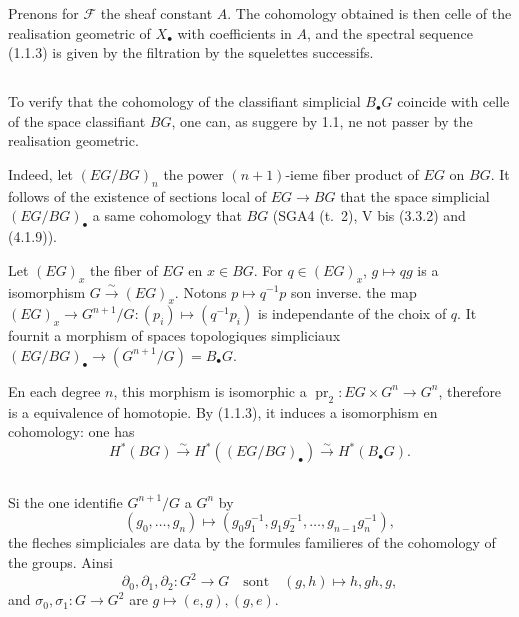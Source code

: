 \documentclass[11pt,a4paper]{article}
\theoremstyle{plain}
\theoremstyle{definition}
\DeclareMathOperator{\pr}{pr}
\begin{document}
Prenons for $\mathscr{F}$ the sheaf constant $A$. The cohomology obtained is then celle of the realisation geometric of $X_\bullet$ with coefficients in $A$, and the spectral sequence (1.1.3) is given by the filtration by the squelettes successifs.

\subsection{}\label{1.2}

To verify that the cohomology of the classifiant simplicial $B_\bullet G$ coincide with celle of the space classifiant $BG$, one can, as suggere by 1.1, ne not passer by the realisation geometric.

Indeed, let $(EG/BG)_n$ the power $(n+1)$-ieme fiber product of $EG$ on $BG$. It follows of the existence of sections local of $EG \to BG$ that the space simplicial $(EG/BG)_\bullet$ a same cohomology that $BG$ (SGA4 (t.~2), V bis (3.3.2) and (4.1.9)).

Let $(EG)_x$ the fiber of $EG$ en $x \in BG$. For $q \in (EG)_x$, $g \mapsto qg$ is a isomorphism $G \xrightarrow{\sim} (EG)_x$. Notons $p \mapsto q^{-1}p$ son inverse. the map $(EG)_x \to G^{n+1}/G : (p_i) \mapsto (q^{-1}p_i)$ is independante of the choix of $q$. It fournit a morphism of spaces topologiques simpliciaux $(EG/BG)_\bullet \to (G^{n+1}/G) = B_\bullet G$.

En each degree $n$, this morphism is isomorphic a $\pr_2 : EG \times G^n \to G^n$, therefore is a equivalence of homotopie. By (1.1.3), it induces a isomorphism en cohomology: one has
\begin{equation}\label{1.2.1}
H^*(BG) \xrightarrow{\sim} H^*((EG/BG)_\bullet) \xrightarrow{\sim} H^*(B_\bullet G).
\end{equation}

\subsection{}\label{1.3}

Si the one identifie $G^{n+1}/G$ a $G^n$ by
\begin{equation}\label{1.3.1}
(g_0, \ldots, g_n) \longmapsto (g_0 g_1^{-1}, g_1 g_2^{-1}, \ldots, g_{n-1} g_n^{-1}),
\end{equation}
the fleches simpliciales are data by the formules familieres of the cohomology of the groups. Ainsi
\begin{equation}\label{1.3.2}
\partial_0, \partial_1, \partial_2 : G^2 \to G \quad \text{sont} \quad (g,h) \mapsto h, gh, g,
\end{equation}
and $\sigma_0, \sigma_1 : G \to G^2$ are $g \mapsto (e,g), (g,e)$.
\end{document}

